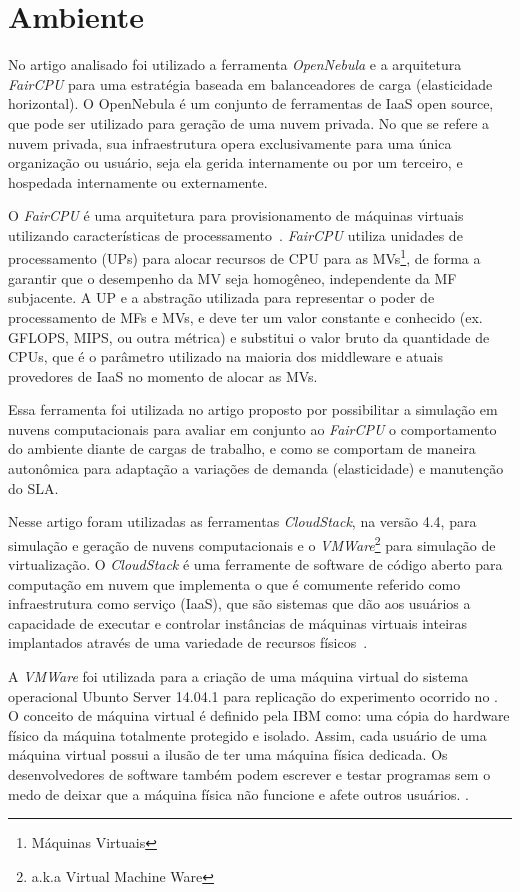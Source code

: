 \section{Ambiente}
\label{sec:ambiente}

No artigo analisado foi utilizado a ferramenta \textit{OpenNebula} e a arquitetura \textit{FairCPU} para uma estratégia baseada em balanceadores de carga (elasticidade horizontal). O OpenNebula é um conjunto de ferramentas de IaaS open source, que pode ser utilizado para geração de uma nuvem privada. No que se refere a nuvem privada, sua infraestrutura opera exclusivamente para uma única organização ou usuário, seja ela gerida internamente ou por um terceiro, e hospedada internamente ou externamente.

O \textit{FairCPU} é uma arquitetura para provisionamento de máquinas virtuais utilizando
características de processamento~\cite{faircpu:12}. \textit{FairCPU} utiliza unidades de processamento (UPs) para alocar recursos de CPU para as MVs\footnote{Máquinas Virtuais}, de forma a garantir que o desempenho da MV seja homogêneo, independente da MF subjacente. A UP e a abstração utilizada para representar o poder de processamento de MFs e MVs, e deve ter um valor constante e conhecido (ex. GFLOPS, MIPS, ou outra métrica) e substitui o valor bruto da quantidade de CPUs, que é o parâmetro utilizado na maioria dos middleware e atuais provedores de IaaS no momento de alocar as MVs.

Essa ferramenta foi utilizada no artigo \cite{coutinho_et_al:14} proposto por possibilitar a simulação em nuvens computacionais para avaliar em conjunto ao \textit{FairCPU} o comportamento do ambiente diante de cargas de trabalho, e como se comportam de maneira autonômica para adaptação a variações de demanda (elasticidade) e manutenção do SLA.

Nesse artigo foram utilizadas as ferramentas \textit{CloudStack}, na versão 4.4, para simulação e geração de nuvens computacionais e o \textit{VMWare}\footnote{a.k.a Virtual Machine Ware} para simulação de virtualização. O \textit{CloudStack}
é uma ferramente de software de código aberto para computação em nuvem que implementa o que é comumente referido como infraestrutura como serviço (IaaS), que são sistemas que dão aos usuários a capacidade de executar e controlar instâncias de máquinas virtuais inteiras implantados através de uma variedade de recursos físicos~\cite{nurmi_2009}. 

A \textit{VMWare} foi utilizada para a criação de uma máquina virtual do sistema operacional Ubunto Server 14.04.1 para replicação do experimento ocorrido no \cite{elaine_et_al:14}. O conceito de máquina virtual é definido pela IBM como: uma cópia do hardware físico da máquina totalmente protegido e isolado. Assim, cada usuário de uma máquina virtual possui a ilusão de ter uma máquina física dedicada. Os desenvolvedores de software também podem escrever e testar programas sem o medo de deixar que a máquina física
não funcione e afete outros usuários. \cite{sugerman2001virtualizing}.

